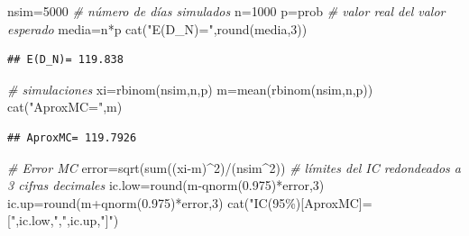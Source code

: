 \documentclass[
]{book}
\newenvironment{Shaded}{\begin{snugshade}}{\end{snugshade}}
\newcommand{\CommentTok}[1]{\textcolor[rgb]{0.56,0.35,0.01}{\textit{#1}}}
\newcommand{\DecValTok}[1]{\textcolor[rgb]{0.00,0.00,0.81}{#1}}
\newcommand{\FloatTok}[1]{\textcolor[rgb]{0.00,0.00,0.81}{#1}}
\newcommand{\FunctionTok}[1]{\textcolor[rgb]{0.00,0.00,0.00}{#1}}
\newcommand{\NormalTok}[1]{#1}
\newcommand{\OtherTok}[1]{\textcolor[rgb]{0.56,0.35,0.01}{#1}}
\newcommand{\SpecialCharTok}[1]{\textcolor[rgb]{0.00,0.00,0.00}{#1}}
\newcommand{\StringTok}[1]{\textcolor[rgb]{0.31,0.60,0.02}{#1}}
\theoremstyle{definition}
\theoremstyle{definition}
\theoremstyle{definition}
\theoremstyle{definition}
\theoremstyle{remark}
\begin{document}
\begin{Shaded}
\begin{Highlighting}[]
\NormalTok{nsim}\OtherTok{=}\DecValTok{5000} \CommentTok{\# número de días simulados}
\NormalTok{n}\OtherTok{=}\DecValTok{1000}
\NormalTok{p}\OtherTok{=}\NormalTok{prob}
\CommentTok{\# valor real del valor esperado}
\NormalTok{media}\OtherTok{=}\NormalTok{n}\SpecialCharTok{*}\NormalTok{p}
\FunctionTok{cat}\NormalTok{(}\StringTok{"E(D\_N)="}\NormalTok{,}\FunctionTok{round}\NormalTok{(media,}\DecValTok{3}\NormalTok{))}
\end{Highlighting}
\end{Shaded}

\begin{verbatim}
## E(D_N)= 119.838
\end{verbatim}

\begin{Shaded}
\begin{Highlighting}[]
\CommentTok{\# simulaciones}
\NormalTok{xi}\OtherTok{=}\FunctionTok{rbinom}\NormalTok{(nsim,n,p)}
\NormalTok{m}\OtherTok{=}\FunctionTok{mean}\NormalTok{(}\FunctionTok{rbinom}\NormalTok{(nsim,n,p))}
\FunctionTok{cat}\NormalTok{(}\StringTok{"AproxMC="}\NormalTok{,m)}
\end{Highlighting}
\end{Shaded}

\begin{verbatim}
## AproxMC= 119.7926
\end{verbatim}

\begin{Shaded}
\begin{Highlighting}[]
\CommentTok{\# Error MC}
\NormalTok{error}\OtherTok{=}\FunctionTok{sqrt}\NormalTok{(}\FunctionTok{sum}\NormalTok{((xi}\SpecialCharTok{{-}}\NormalTok{m)}\SpecialCharTok{\^{}}\DecValTok{2}\NormalTok{)}\SpecialCharTok{/}\NormalTok{(nsim}\SpecialCharTok{\^{}}\DecValTok{2}\NormalTok{))}
\CommentTok{\# límites del IC redondeados a 3 cifras decimales}
\NormalTok{ic.low}\OtherTok{=}\FunctionTok{round}\NormalTok{(m}\SpecialCharTok{{-}}\FunctionTok{qnorm}\NormalTok{(}\FloatTok{0.975}\NormalTok{)}\SpecialCharTok{*}\NormalTok{error,}\DecValTok{3}\NormalTok{)}
\NormalTok{ic.up}\OtherTok{=}\FunctionTok{round}\NormalTok{(m}\SpecialCharTok{+}\FunctionTok{qnorm}\NormalTok{(}\FloatTok{0.975}\NormalTok{)}\SpecialCharTok{*}\NormalTok{error,}\DecValTok{3}\NormalTok{)}
\FunctionTok{cat}\NormalTok{(}\StringTok{"IC(95\%)[AproxMC]=["}\NormalTok{,ic.low,}\StringTok{","}\NormalTok{,ic.up,}\StringTok{"]"}\NormalTok{)}
\end{Highlighting}
\end{Shaded}
\end{document}
